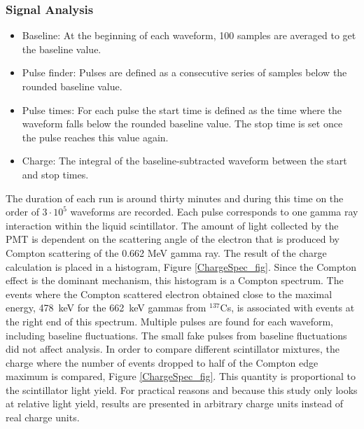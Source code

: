 \documentclass{JINST}
\begin{document}
\subsubsection{Signal Analysis}
\begin{itemize}
\item Baseline: At the beginning of each waveform, 100 samples are averaged to get the baseline value. 
\item Pulse finder: Pulses are defined as a consecutive series of samples below the rounded baseline value.
\item Pulse times: For each pulse the start time is defined as the time where the waveform falls below the rounded baseline value. The stop time is set once the pulse reaches this value again.  
\item Charge: The integral of the baseline-subtracted waveform between the start and stop times.  
\end{itemize}

The duration of each run is around thirty minutes and during this time on the order of $3\cdot10^5$ waveforms are recorded. Each pulse corresponds to one gamma ray interaction within the liquid scintillator. The amount of light collected by the PMT is dependent on the scattering angle of the electron that is produced by Compton scattering of the 0.662 MeV gamma ray. The result of the charge calculation is placed in a histogram, Figure \ref{ChargeSpec_fig}. Since the Compton effect is the dominant mechanism, this histogram is a Compton spectrum. The events where the Compton scattered electron obtained close to the maximal energy, 478~keV for the 662~keV gammas from $^{137}$Cs, is associated with events at the right end of this spectrum. %
Multiple pulses are found for each waveform, including baseline fluctuations. The small fake pulses from baseline fluctuations did not affect analysis. In order to compare different scintillator mixtures, the charge where the number of events dropped to half of the Compton edge maximum is compared, Figure \ref{ChargeSpec_fig}. This quantity is proportional to the scintillator light yield. For practical reasons and because this study only looks at relative light yield, results are presented in arbitrary charge units instead of real charge units.
\end{document}
